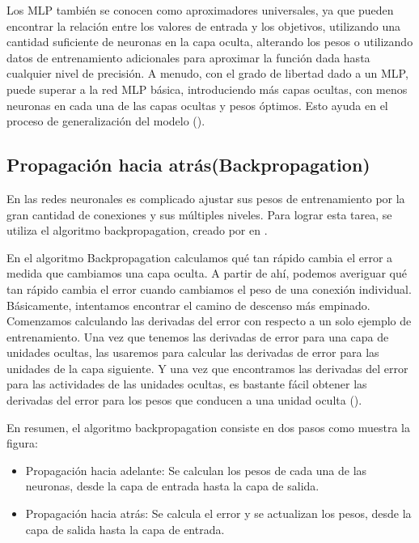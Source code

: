 Los MLP también se conocen como aproximadores universales, ya que pueden encontrar la relación entre los valores de entrada y los objetivos, utilizando una cantidad suficiente de neuronas en la capa oculta, alterando los pesos o utilizando datos de entrenamiento adicionales para aproximar la función dada hasta cualquier nivel de precisión. A menudo, con el grado de libertad dado a un MLP, puede superar a la red MLP básica, introduciendo más capas ocultas, con menos neuronas en cada una de las capas ocultas y pesos óptimos. Esto ayuda en el proceso de generalización del modelo (\cite{goyal2018Deep}).

\subsection{Propagación hacia atrás(Backpropagation)}

En las redes neuronales es complicado ajustar sus pesos de entrenamiento por la gran cantidad de conexiones y sus múltiples niveles. Para lograr esta tarea, se utiliza el algoritmo backpropagation, creado por \citeauthor{rumelhart1986Parallel} en \citeyear{rumelhart1986Parallel}.

En el algoritmo Backpropagation calculamos qué tan rápido cambia el error a medida que cambiamos una capa oculta. A partir de ahí, podemos averiguar qué tan rápido cambia el error cuando cambiamos el peso de una conexión individual. Básicamente, intentamos encontrar el camino de descenso más empinado. Comenzamos calculando las derivadas del error con respecto a un solo ejemplo de entrenamiento. Una vez que tenemos las derivadas de error para una capa de unidades ocultas, las usaremos para calcular las derivadas de error para las unidades de la capa siguiente. Y una vez que encontramos las derivadas del error para las actividades de las unidades ocultas, es bastante fácil obtener las derivadas del error para los pesos que conducen a una unidad oculta (\cite{buduma2017Fundamentals}).

En resumen, el algoritmo backpropagation consiste en dos pasos como muestra la figura:

\begin{itemize}
\item Propagación hacia adelante: Se calculan los pesos de cada una de las neuronas, desde la capa de entrada hasta la capa de salida.

\item Propagación hacia atrás: Se calcula el error y se actualizan los pesos, desde la capa de salida hasta la capa de entrada.
\end{itemize}

